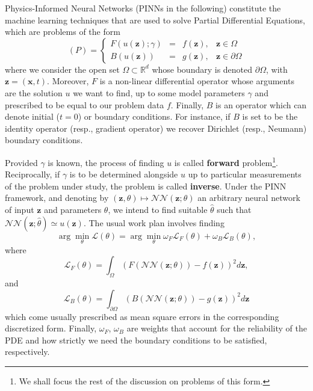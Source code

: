 \documentclass[12pt]{report} %
\newcommand{\tmmathbf}[1]{\ensuremath{\boldsymbol{#1}}}
\newcommand{\tmstrong}[1]{\textbf{#1}}
\begin{document}
Physics-Informed Neural Networks (PINNs in the following) constitute the
machine learning techniques that are used to solve Partial Differential
Equations, which are problems of the form
\begin{equation}
  (P) = \left\{\begin{array}{rlll}
    F (u (\tmmathbf{z}) ; \gamma) & = & f (\tmmathbf{z}), & \tmmathbf{z} \in
    \Omega\\
    B (u (\tmmathbf{z})) & = & g (\tmmathbf{z}), & \tmmathbf{z} \in \partial
    \Omega
  \end{array}\right. \label{pdegeneralform}
\end{equation}
where we consider the open set $\Omega \subset \mathbb{R}^d$ whose boundary is
denoted $\partial \Omega$, with $\tmmathbf{z}= (\tmmathbf{x}, t)$. Moreover,
\(F\) is a non-linear differential operator whose arguments are the solution $u$
we want to find, up to some model parameters $\gamma$ and prescribed to be
equal to our problem data \(f\). Finally, \(B\) is an operator which can denote
initial (\(t = 0\)) or boundary conditions. For instance, if $B$ is set to be
the identity operator (resp., gradient operator) we recover Dirichlet (resp.,
Neumann) boundary conditions.

Provided $\gamma$ is known, the process of finding $u$ is called
{\tmstrong{forward}} problem\footnote{We shall focus the rest of the
discussion on problems of this form.}. Reciprocally, if $\gamma$ is to be
determined alongside $u$ up to particular measurements of the problem under study, the problem is called {\tmstrong{inverse}}. Under
the PINN framework, and denoting by $(\tmmathbf{z}, \theta) \mapsto
\mathcal{N}\mathcal{N} (\tmmathbf{z}; \theta)$ an arbitrary neural network of input $\tmmathbf{z}$ and 
parameters $\theta$, we intend to find suitable $\hat{ \theta}$ such that
$\mathcal{N}\mathcal{N} (\tmmathbf{z}; \hat{ \theta}) \simeq u (\tmmathbf{z})$. The
usual work plan involves finding
\begin{equation}
   \arg \min_{\theta} \mathcal{L} (\theta) = \arg \min_{\theta} \omega_F
   \mathcal{L}_F (\theta) + \omega_B \mathcal{L}_B (\theta), 
   \label{loss-fun-pinn}
\end{equation}
where
\begin{equation}
   \mathcal{L}_F (\theta) = \int_{\Omega} (F (\mathcal{N}\mathcal{N}
   (\tmmathbf{z}; \theta)) - f (\tmmathbf{z}))^2 d\tmmathbf{z}, 
   \label{loss-F}
\end{equation}
and
\begin{equation}
    \mathcal{L}_B (\theta) = \int_{\partial \Omega} (B (\mathcal{N}\mathcal{N}
   (\tmmathbf{z}; \theta)) - g (\tmmathbf{z}))^2 d\tmmathbf{z}
   \label{loss-boundary}
\end{equation}
which come usually prescribed as mean square errors in the corresponding
discretized form. Finally, $\omega_F$, $\omega_B$ are weights that account for the
reliability of the PDE and how strictly we need the boundary conditions to be
satisfied, respectively.
\end{document}
